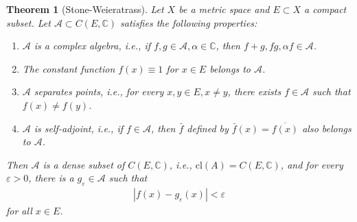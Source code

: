 \documentclass[12pt,leqno]{amsart}
\newtheorem{theorem}{Theorem}[section]
\theoremstyle{definition}
\numberwithin{equation}{subsection}
\begin{document}
\medskip

\begin{theorem}[Stone-Weieratrass]
Let $X$ be a metric space and $E\subset X$ a compact subset. Let $\mathcal{A}\subset C(E,\mathbb{C})$ satisfies the following properties:
\begin{enumerate}
    \item $\mathcal{A}$ is a complex algebra, i.e., if $f,g\in \mathcal{A}, \alpha\in\mathbb{C}$, then $f+g,fg,\alpha f\in\mathcal{A}$.
    \item The constant function $f(x)\equiv 1$ for $x\in E$ belongs to $\mathcal{A}$.
    \item $\mathcal{A}$ separates points, i.e., for every $x,y\in E, x\neq y$, there exists $f\in\mathcal{A}$ such that $f(x)\neq f(y)$.
    \item $\mathcal{A}$ is self-adjoint, i.e., if $f\in \mathcal{A}$, then $\bar{f}$ defined by $\bar{f}(x) = \overline{f(x)}$ also belongs to $\mathcal{A}$.
\end{enumerate}
Then $\mathcal{A}$ is a dense subset of $C(E,\mathbb{C})$, i.e., $\text{cl}(A) = C(E,\mathbb{C})$, and for every $\varepsilon > 0$, there is a $g_\varepsilon\in\mathcal{A}$ such that
\begin{align*}
    \left|f(x) - g_\varepsilon(x)\right| < \varepsilon
\end{align*}
for all $x\in E$.
\end{theorem}
\end{document}

